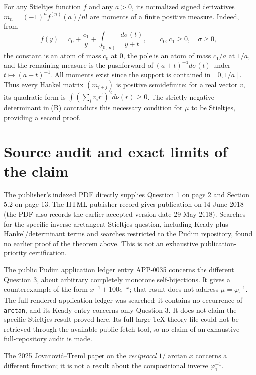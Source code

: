 \documentclass[11pt,a4paper]{article}
\begin{document}
For any Stieltjes function $f$ and any $a>0$, its normalized signed
derivatives $m_n=(-1)^nf^{(n)}(a)/n!$ are moments of a finite
positive measure. Indeed, from
\[
 f(y)=c_0+\frac{c_1}{y}+\int_{[0,\infty)}\frac{d\sigma(t)}{y+t},
 \qquad c_0,c_1\ge0,\quad \sigma\ge0,
\]
the constant is an atom of mass $c_0$ at $0$, the pole is an atom
of mass $c_1/a$ at $1/a$, and the remaining measure is the pushforward
of $(a+t)^{-1}d\sigma(t)$ under $t\mapsto(a+t)^{-1}$.
All moments exist since the support is contained in $[0,1/a]$.
Thus every Hankel matrix $(m_{i+j})$ is positive semidefinite:
for a real vector $v$, its quadratic form is
$\int(\sum_i v_i r^i)^2d\nu(r)\ge0$.
The strictly negative determinant in (B) contradicts this necessary
condition for $\mu$ to be Stieltjes, providing a second proof.

\section{Source audit and exact limits of the claim}
The publisher's indexed PDF directly supplies Question 1 on page 2
and Section 5.2 on page 13. The HTML publisher record gives publication
on 14 June 2018 (the PDF also records the earlier accepted-version
date 29 May 2018).
Searches for the specific inverse-arctangent Stieltjes question,
including Keady plus Hankel/determinant terms and searches restricted
to the Pudim repository, found no earlier proof of the theorem above.
This is not an exhaustive publication-priority certification.

The public Pudim application ledger entry APP-0035 concerns the
different Question 3, about arbitrary completely monotone self-bijections.
It gives a counterexample of the form $x^{-1}+100e^{-x}$; that result
does not address $\mu=\varphi_1^{-1}$. The full rendered application
ledger was searched: it contains no occurrence of \texttt{arctan},
and its Keady entry concerns only Question 3. It does not claim the
specific Stieltjes result proved here. Its full
large TeX theory file could not be retrieved through the available
public-fetch tool, so no claim of an exhaustive full-repository audit
is made.

The 2025 Jovanovi\'c--Treml paper on the \emph{reciprocal}
$1/\arctan x$ concerns a different function; it is not a result
about the compositional inverse $\varphi_1^{-1}$.
\end{document}
